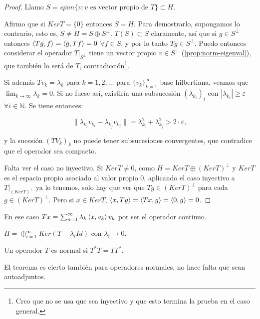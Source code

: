 \begin{proof}
  Llamo $S=\overline{span}\{v:v\text{ es vector propio de } T\}\subset H$.
  
  Afirmo que si $Ker T=\{0\} $ entonces $S=H$. Para demostrarlo, supongamos lo
  contrario, esto es, $S\neq H=S \oplus S^\bot$. $T(S)\subset S$
  claramente, así que si $g\in S^\bot$ entonces $\left\langle Tg,f\right\rangle=\left\langle g,Tf\right\rangle=0$ $\forall
  f\in S$, y por lo tanto $Tg\in S^\bot$. Puedo entonces considerar el operador
   $T|_{S^\bot}$ tiene un vector propio $v\in S^\bot$
   (\ref{prop:norm-eigenval}), que también lo será de $T$,
   contradicción\footnote{Creo que no se usa que sea inyectivo y que esto
   termina la prueba en el caso general.}.
  
  Si además $Tv_k=\lambda_k$ para $k=1,2,\ldots$ para $\{v_k\}_{k=1}^\infty $ 
  base hilbertiana, veamos que $\lim_{k \to \infty} \lambda_k=0$. Si no fuese
  así, existiría una subsucesión $(\lambda_{k_i})_i$ con $|\lambda_{k_i}|\ge
  \varepsilon$ $\forall i \in \mathbb{N}$. Se tiene entonces:

  \[
  \|\lambda_{k_i}v_{k_i}-\lambda_{k_j}v_{k_j}\|
  =\lambda_{k_i}^2+\lambda_{k_j}^2>2\cdot \varepsilon
  ,\] 

  y la sucesión $(TV_{k})_k$ no puede tener subsucesiones convergentes, que
  contradice que el operador sea compacto.

  Falta ver el caso no inyectivo. Si $KerT\neq 0$, como $H=KerT \oplus
  (KerT)^\bot$ y $KerT$ es el espacio propio asociado al valor propio $0$,
  aplicando el caso inyectivo a $T|_{(KerT)^\bot}$ ya lo tenemos, solo hay que
  ver que $Tg\in (KerT)^\bot$ para cada $g\in (KerT)^\bot$. Pero si $x\in KerT$,
  $\left\langle x,Tg\right\rangle=\left\langle Tx,g\right\rangle=\left\langle0,g\right\rangle=0$.
\end{proof}

\begin{remark}
  En ese caso $Tx=\sum_{n=1}^{\infty} \lambda_k\left\langle x,v_k\right\rangle v_k$ por ser el
  operador continuo.
\end{remark}

\begin{remark}
  $H=\oplus_{i=1}^\infty Ker(T-\lambda_i Id)$ con $\lambda_i\to 0$.
\end{remark}

\begin{definition}
  Un operador $T$ es normal si $T^*T=TT^*$.
\end{definition}

El teorema es cierto también para operadores normales, no hace falta que sean
autoadjuntos.

